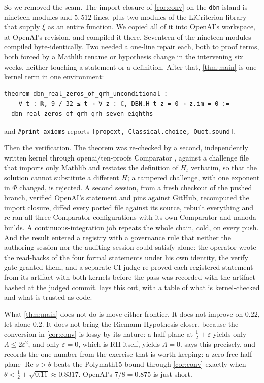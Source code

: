 \documentclass[11pt]{article}
\theoremstyle{definition}
\newcommand{\lean}[1]{\texttt{#1}}
\newcommand{\Lam}{\Lambda}
\newcommand{\Hfun}{H}
\newcommand{\re}{\operatorname{Re}}
\begin{document}
So we removed the seam. The import closure of \cref{cor:conv} on the \lean{dbn} island is nineteen modules and $5{,}512$ lines, plus two modules of the LiCriterion library that supply $\xi$ as an entire function. We copied all of it into OpenAI's workspace, at OpenAI's revision, and compiled it there. Seventeen of the nineteen modules compiled byte-identically. Two needed a one-line repair each, both to proof terms, both forced by a Mathlib rename or hypothesis change in the intervening six weeks, neither touching a statement or a definition. After that, \cref{thm:main} is one kernel term in one environment:
\begin{lstlisting}
theorem dbn_real_zeros_of_qrh_unconditional :
    ∀ t : ℝ, 9 / 32 ≤ t → ∀ z : ℂ, DBN.H t z = 0 → z.im = 0 :=
  dbn_real_zeros_of_qrh qrh_seven_eighths
\end{lstlisting}
and \lean{\#print axioms} reports \lean{[propext, Classical.choice, Quot.sound]}.

Then the verification. The theorem was re-checked by a second, independently written kernel through openai/ten-proofs Comparator \cite{Comparator}, against a challenge file that imports only Mathlib and restates the definition of $\Hfun_t$ verbatim, so that the solution cannot substitute a different $\Hfun$; a tampered challenge, with one exponent in $\Phi$ changed, is rejected. A second session, from a fresh checkout of the pushed branch, verified OpenAI's statement and pins against GitHub, recomputed the import closure, diffed every ported file against its source, rebuilt everything and re-ran all three Comparator configurations with its own Comparator and nanoda builds. A continuous-integration job repeats the whole chain, cold, on every push. And the result entered a registry with a governance rule that neither the authoring session nor the auditing session could satisfy alone: the operator wrote the read-backs of the four formal statements under his own identity, the verify gate granted them, and a separate CI judge re-proved each registered statement from its artifact with both kernels before the pass was recorded with the artifact hashed at the judged commit.  lays this out, with a table of what is kernel-checked and what is trusted as code.

What \cref{thm:main} does not do is move either frontier. It does not improve on $0.22$, let alone $0.2$. It does not bring the Riemann Hypothesis closer, because the conversion in \cref{cor:conv} is lossy by its nature: a half-plane at $\tfrac12 + \varepsilon$ yields only $\Lam \le 2\varepsilon^2$, and only $\varepsilon = 0$, which is RH itself, yields $\Lam = 0$.  says this precisely, and records the one number from the exercise that is worth keeping: a zero-free half-plane $\re s > \theta$ beats the Polymath15 bound through \cref{cor:conv} exactly when $\theta < \tfrac12 + \sqrt{0.11} \approx 0.8317$. OpenAI's $7/8 = 0.875$ is just short.
\end{document}
